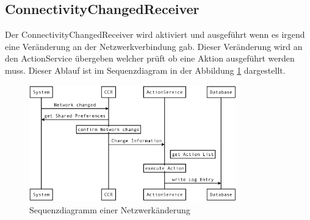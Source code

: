 \subsection{ConnectivityChangedReceiver}
Der ConnectivityChangedReceiver wird aktiviert und ausgeführt wenn es irgend eine Veränderung an der Netzwerkverbindung gab. Dieser Veränderung wird an den ActionService übergeben welcher prüft ob eine Aktion ausgeführt werden muss. Dieser Ablauf ist im Sequenzdiagram in der Abbildung \ref{fig:seqactions} dargestellt.
\begin{figure}[ht]
    \centering
    \includegraphics[width=0.8\textwidth]{images/seqActions.png}
    \caption{Sequenzdiagramm einer Netzwerkänderung}
    \label{fig:seqactions}
\end{figure}


